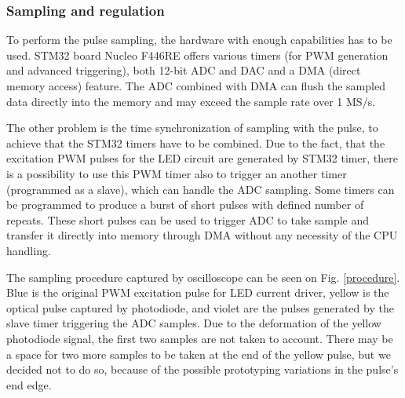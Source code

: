 \subsubsection{Sampling and regulation}

To perform the pulse sampling, the hardware with enough capabilities has to be used. STM32 board Nucleo F446RE \cite{NucF446RE} offers various timers (for PWM generation and advanced triggering), both 12-bit ADC and DAC and a DMA (direct memory access) feature. The ADC combined with DMA can flush the sampled data directly into the memory and may exceed the sample rate over 1 MS/s.

\par

The other problem is the time synchronization of sampling with the pulse, to achieve that the STM32 timers have to be combined. Due to the fact, that the excitation PWM pulses for the LED circuit are generated by STM32 timer, there is a possibility to use this PWM timer also to trigger an another timer (programmed as a slave), which can handle the ADC sampling. Some timers can be programmed to produce a burst of short pulses with defined number of repeats. These short pulses can be used to trigger ADC to take sample and transfer it directly into memory through DMA without any necessity of the CPU handling.  
\par
The sampling procedure captured by oscilloscope can be seen on Fig. \ref{procedure}. Blue is the original PWM excitation pulse for LED current driver, yellow is the optical pulse captured by photodiode, and violet are the pulses generated by the slave timer triggering the ADC samples. Due to the deformation of the yellow photodiode signal, the first two samples are not taken to account. 
There may be a space for two more samples to be taken at the end of the yellow pulse, but we decided not to do so, because of the possible prototyping variations in the pulse's end edge. 


